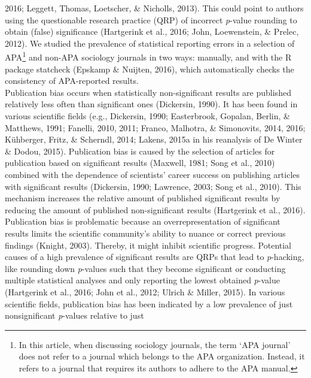 \documentclass[
  12pt,
]{article}
\begin{document}
2016; Leggett, Thomas, Loetscher, \& Nicholls, 2013). This could point
to authors using the questionable research practice (QRP) of incorrect
\emph{p}-value rounding to obtain (false) significance (Hartgerink et
al., 2016; John, Loewenstein, \& Prelec, 2012). We studied the
prevalence of statistical reporting errors in a selection of
APA\footnote{In this article, when discussing sociology journals, the
  term `APA journal' does not refer to a journal which belongs to the
  APA organization. Instead, it refers to a journal that requires its
  authors to adhere to the APA manual.} and non-APA sociology journals
in two ways: manually, and with the R package statcheck (Epskamp \&
Nuijten, 2016), which automatically checks the consistency of
APA-reported results.\\
\hspace*{0.333em}\hspace*{0.333em}\hspace*{0.333em}\hspace*{0.333em}Publication
bias occurs when statistically non-significant results are published
relatively less often than significant ones (Dickersin, 1990). It has
been found in various scientific fields (e.g., Dickersin, 1990;
Easterbrook, Gopalan, Berlin, \& Matthews, 1991; Fanelli, 2010, 2011;
Franco, Malhotra, \& Simonovits, 2014, 2016; Kühberger, Fritz, \&
Scherndl, 2014; Lakens, 2015a in his reanalysis of De Winter \& Dodou,
2015). Publication bias is caused by the selection of articles for
publication based on significant results (Maxwell, 1981; Song et al.,
2010) combined with the dependence of scientists' career success on
publishing articles with significant results (Dickersin, 1990; Lawrence,
2003; Song et al., 2010). This mechanism increases the relative amount
of published significant results by reducing the amount of published
non-significant results (Hartgerink et al., 2016). Publication bias is
problematic because an overrepresentation of significant results limits
the scientific community's ability to nuance or correct previous
findings (Knight, 2003). Thereby, it might inhibit scientific progress.
Potential causes of a high prevalence of significant results are QRPs
that lead to \emph{p}-hacking, like rounding down \emph{p}-values such
that they become significant or conducting multiple statistical analyses
and only reporting the lowest obtained \emph{p}-value (Hartgerink et
al., 2016; John et al., 2012; Ulrich \& Miller, 2015). In various
scientific fields, publication bias has been indicated by a low
prevalence of just nonsignificant \emph{p}-values relative to just
\end{document}
